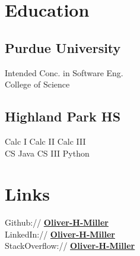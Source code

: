 \documentclass[letterpaper]{deedy-resume} %
\begin{document}
\begin{minipage}[t]{0.33\textwidth} %


\section{Education} 

\subsection{Purdue University}

%

Intended Conc. in Software Eng. \\
College of Science \\

\sectionspace %


\subsection{Highland Park HS}

Calc I \textbullet{} Calc II \textbullet{} Calc III \\
 CS Java \textbullet{} CS III Python

\sectionspace %


\section{Links} 

Github:// \href{https://github.com/Oliver-H-Miller}{\bf Oliver-H-Miller} \\
LinkedIn:// \href{https://www.linkedin.com/in/Oliver-H-Miller}{\bf Oliver-H-Miller} \\
StackOverflow:// \href{https://stackoverflow.com/users/3152313}{\bf Oliver-H-Miller} \\


\end{minipage}
\end{document}
